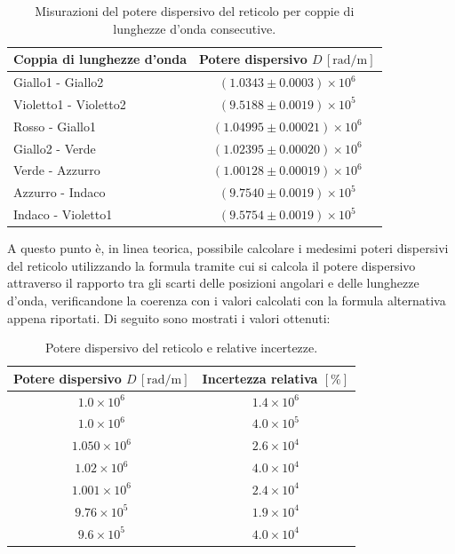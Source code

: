 \documentclass[a4paper,12pt]{article}
\begin{document}
\begin{table}[H]
\centering
\begin{tabular}{|l|c|}
\hline
Coppia di lunghezze d’onda & Potere dispersivo \( D \, [\text{rad}/\text{m}] \) \\ 
\hline
Giallo1 - Giallo2 & \( (1.0343 \pm 0.0003) \times 10^6 \) \\ 
\hline
Violetto1 - Violetto2 & \( (9.5188 \pm 0.0019) \times 10^5 \) \\ 
\hline
Rosso - Giallo1 & \( (1.04995 \pm 0.00021) \times 10^6 \) \\ 
\hline
Giallo2 - Verde & \( (1.02395 \pm 0.00020) \times 10^6 \) \\ 
\hline
Verde - Azzurro & \( (1.00128 \pm 0.00019) \times 10^6 \) \\ 
\hline
Azzurro - Indaco & \( (9.7540 \pm 0.0019) \times 10^5 \) \\ 
\hline
Indaco - Violetto1 & \( (9.5754 \pm 0.0019) \times 10^5 \) \\ 
\hline
\end{tabular}
\caption{Misurazioni del potere dispersivo del reticolo per coppie di lunghezze d’onda consecutive.}
\end{table}
A questo punto è, in linea teorica, possibile calcolare i medesimi poteri dispersivi del reticolo utilizzando la formula tramite cui si calcola il potere dispersivo attraverso il rapporto tra gli scarti delle posizioni angolari e delle lunghezze d’onda, verificandone la coerenza con i valori calcolati con la formula alternativa appena riportati.
Di seguito sono mostrati i valori ottenuti:
\begin{table}[H]
    \centering
    \begin{tabular}{|c|c|}
    \hline
    Potere dispersivo \( D \, [\text{rad}/\text{m}] \) & Incertezza relativa \([\%]\) \\ 
    \hline
    \( 1.0 \times 10^6 \) & \( 1.4 \times 10^6 \) \\ 
    \hline
    \( 1.0 \times 10^6 \) & \( 4.0 \times 10^5 \) \\ 
    \hline
    \( 1.050 \times 10^6 \) & \( 2.6 \times 10^4 \) \\ 
    \hline
    \( 1.02 \times 10^6 \) & \( 4.0 \times 10^4 \) \\ 
    \hline
    \( 1.001 \times 10^6 \) & \( 2.4 \times 10^4 \) \\ 
    \hline
    \( 9.76 \times 10^5 \) & \( 1.9 \times 10^4 \) \\ 
    \hline
    \( 9.6 \times 10^5 \) & \( 4.0 \times 10^4 \) \\ 
    \hline
    \end{tabular}
    \caption{Potere dispersivo del reticolo e relative incertezze.}
    \end{table}
    
\end{document}

